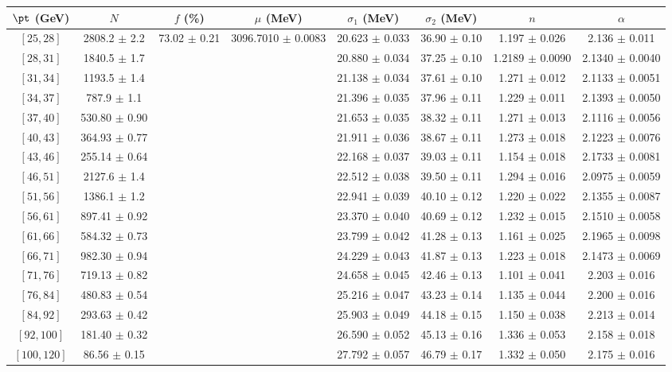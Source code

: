 \begin{tabular}{c||c|c|c|c|c|c|c}
$\pt$ (GeV) & $N$ & $f$ (\%) & $\mu$ (MeV) & $\sigma_1$ (MeV) & $\sigma_2$ (MeV) & $n$ & $\alpha$ \\
\hline
$[25, 28]$ & 2808.2 $\pm$ 2.2 & \multirow{17}{*}{73.02 $\pm$ 0.21} & \multirow{17}{*}{3096.7010 $\pm$ 0.0083} & 20.623 $\pm$ 0.033 & 36.90 $\pm$ 0.10 & 1.197 $\pm$ 0.026 & 2.136 $\pm$ 0.011\\
$[28, 31]$ & 1840.5 $\pm$ 1.7 &  &  & 20.880 $\pm$ 0.034 & 37.25 $\pm$ 0.10 & 1.2189 $\pm$ 0.0090 & 2.1340 $\pm$ 0.0040\\
$[31, 34]$ & 1193.5 $\pm$ 1.4 &  &  & 21.138 $\pm$ 0.034 & 37.61 $\pm$ 0.10 & 1.271 $\pm$ 0.012 & 2.1133 $\pm$ 0.0051\\
$[34, 37]$ & 787.9 $\pm$ 1.1 &  &  & 21.396 $\pm$ 0.035 & 37.96 $\pm$ 0.11 & 1.229 $\pm$ 0.011 & 2.1393 $\pm$ 0.0050\\
$[37, 40]$ & 530.80 $\pm$ 0.90 &  &  & 21.653 $\pm$ 0.035 & 38.32 $\pm$ 0.11 & 1.271 $\pm$ 0.013 & 2.1116 $\pm$ 0.0056\\
$[40, 43]$ & 364.93 $\pm$ 0.77 &  &  & 21.911 $\pm$ 0.036 & 38.67 $\pm$ 0.11 & 1.273 $\pm$ 0.018 & 2.1223 $\pm$ 0.0076\\
$[43, 46]$ & 255.14 $\pm$ 0.64 &  &  & 22.168 $\pm$ 0.037 & 39.03 $\pm$ 0.11 & 1.154 $\pm$ 0.018 & 2.1733 $\pm$ 0.0081\\
$[46, 51]$ & 2127.6 $\pm$ 1.4 &  &  & 22.512 $\pm$ 0.038 & 39.50 $\pm$ 0.11 & 1.294 $\pm$ 0.016 & 2.0975 $\pm$ 0.0059\\
$[51, 56]$ & 1386.1 $\pm$ 1.2 &  &  & 22.941 $\pm$ 0.039 & 40.10 $\pm$ 0.12 & 1.220 $\pm$ 0.022 & 2.1355 $\pm$ 0.0087\\
$[56, 61]$ & 897.41 $\pm$ 0.92 &  &  & 23.370 $\pm$ 0.040 & 40.69 $\pm$ 0.12 & 1.232 $\pm$ 0.015 & 2.1510 $\pm$ 0.0058\\
$[61, 66]$ & 584.32 $\pm$ 0.73 &  &  & 23.799 $\pm$ 0.042 & 41.28 $\pm$ 0.13 & 1.161 $\pm$ 0.025 & 2.1965 $\pm$ 0.0098\\
$[66, 71]$ & 982.30 $\pm$ 0.94 &  &  & 24.229 $\pm$ 0.043 & 41.87 $\pm$ 0.13 & 1.223 $\pm$ 0.018 & 2.1473 $\pm$ 0.0069\\
$[71, 76]$ & 719.13 $\pm$ 0.82 &  &  & 24.658 $\pm$ 0.045 & 42.46 $\pm$ 0.13 & 1.101 $\pm$ 0.041 & 2.203 $\pm$ 0.016\\
$[76, 84]$ & 480.83 $\pm$ 0.54 &  &  & 25.216 $\pm$ 0.047 & 43.23 $\pm$ 0.14 & 1.135 $\pm$ 0.044 & 2.200 $\pm$ 0.016\\
$[84, 92]$ & 293.63 $\pm$ 0.42 &  &  & 25.903 $\pm$ 0.049 & 44.18 $\pm$ 0.15 & 1.150 $\pm$ 0.038 & 2.213 $\pm$ 0.014\\
$[92, 100]$ & 181.40 $\pm$ 0.32 &  &  & 26.590 $\pm$ 0.052 & 45.13 $\pm$ 0.16 & 1.336 $\pm$ 0.053 & 2.158 $\pm$ 0.018\\
$[100, 120]$ & 86.56 $\pm$ 0.15 &  &  & 27.792 $\pm$ 0.057 & 46.79 $\pm$ 0.17 & 1.332 $\pm$ 0.050 & 2.175 $\pm$ 0.016\\
\end{tabular}
